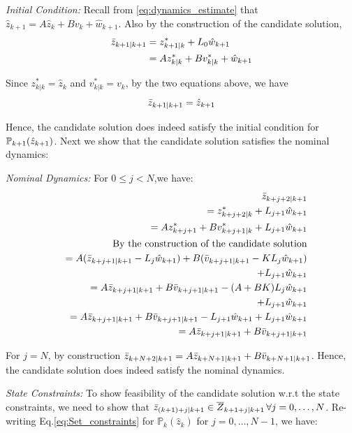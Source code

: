 \textit{Initial Condition:} Recall from \eqref{eq:dynamics_estimate} that $\hat{z}_{k+1} = A\hat{z}_k + Bv_k + \hat{w}_{k+1}$.
Also by the construction of the candidate solution,
\begin{subequations}
\begin{align}
\bar{z}_{k+1|k+1} &= z^{*}_{k+1|k} + L_0 \hat{w}_{k+1} \nonumber \\
&= Az^{*}_{k|k} + Bv^{*}_{k|k} + \hat{w}_{k+1}
\end{align}
\end{subequations}

Since $z^{*}_{k|k}=\hat{z}_k$ and $v^{*}_{k|k} = v_k$, by the two equations above, we have
\begin{equation}
\bar{z}_{k+1|k+1} = \hat{z}_{k+1}
\end{equation}

Hence, the candidate solution does indeed satisfy the initial condition for $\mathbb{P}_{k+1}(\hat{z}_{k+1})$.
Next we show that the candidate solution satisfies the nominal dynamics:

\textit{ Nominal Dynamics:} For $0\leq j<N$,we have:
\begin{eqnarray*}
&& \bar{z}_{k+j+2|k+1} 
\\
&& = z^{*}_{k+j+2|k} + L_{j+1}\hat{w}_{k+1} \\
&& = Az^{*}_{k+j+1}+Bv^{*}_{k+j+1|k} + L_{j+1}\hat{w}_{k+1} \\
&& \text{By the construction of the candidate solution} \nonumber \\
&& = A(\bar{z}_{k+j+1|k+1}-L_j\hat{w}_{k+1}) + B(\bar{v}_{k+j+1|k+1} - KL_j \hat{w}_{k+1}) \nonumber \\
&& \;\; + L_{j+1}\hat{w}_{k+1} \\
&& = A\bar{z}_{k+j+1|k+1} + B\bar{v}_{k+j+1|k+1} -(A+BK)L_j\hat{w}_{k+1} \nonumber \\
&& \;\; + L_{j+1}\hat{w}_{k+1} \\
&& = A\bar{z}_{k+j+1|k+1} + B\bar{v}_{k+j+1|k+1} - L_{j+1}\hat{w}_{k+1} + L_{j+1}\hat{w}_{k+1} \\
&& = A\bar{z}_{k+j+1|k+1} + B\bar{v}_{k+j+1|k+1}
\end{eqnarray*}

For $j=N$, by construction $\bar{z}_{k+N+2|k+1} = A\bar{z}_{k+N+1|k+1} + B\bar{v}_{k+N+1|k+1}$. Hence, the candidate solution does indeed satisfy the nominal dynamics.

\textit{State Constraints:} To show feasibility of the candidate solution w.r.t the state constraints, we need to show that $\bar{z}_{(k+1)+j|k+1}\in \overline{Z}_{k+1+j|k+1}\, \forall j=0,\dotsc,N$. Re-writing Eq.\ref{eq:Set_constraints} for $\mathbb{P}_{k}(\hat{z}_k)$ for $j=0,\dotsc,N-1$, we have:

